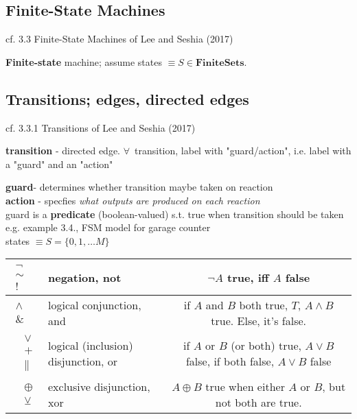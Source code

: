 \documentclass[10pt]{amsart}
\begin{document}
\begin{multicols*}{2}
\section{Finite-State Machines}

cf. 3.3 Finite-State Machines of Lee and Seshia (2017) \cite{LeSe2017}

\textbf{Finite-state} machine; assume states $\equiv S \in \textbf{FiniteSets}$.  

\subsection{Transitions; edges, directed edges }

cf. 3.3.1 Transitions of Lee and Seshia (2017) \cite{LeSe2017}

\textbf{transition} - directed edge.  $\forall \, $ transition, label with "guard/action", i.e. label with a "guard" and an "action"

\textbf{guard}- determines whether transition maybe taken on reaction \\
\textbf{action} - specfies \emph{what outputs are produced on each reaction} \\

guard is a \textbf{predicate} (boolean-valued) s.t. true when transition should be taken  \\
e.g. example 3.4., FSM model for garage counter \\
states $\equiv S = \lbrace 0 ,1, \dots M \rbrace$  


\begin{tabular}{l l c}
	$\begin{aligned}
	\neg \\ 
	\sim \\ 
	! 
	\end{aligned}$ & negation, not &  $\neg A$ true, iff $A$ false  \\ \hline
	$\begin{aligned}
	\wedge \\ \& \
	\end{aligned}$ & logical conjunction, and & if $A$ and $B$ both true, $T$, $A \wedge B$ true.  Else, it's false.    \\ \hline 
	$\begin{aligned}
	& \vee \\ & + \\ & \parallel \end{aligned}$ & logical (inclusion) disjunction, or & if $A$ or $B$ (or both) true, $A \vee B$ false, if both false, $A\vee B$ false  
	 \\ \hline  
	$\begin{aligned}
	& \oplus \\ 
	& \veebar \end{aligned}$ & exclusive disjunction, xor & $A \oplus B$ true when either $A$ or $B$, but not both are true.    
\end{tabular}


\end{multicols*}
\end{document}
